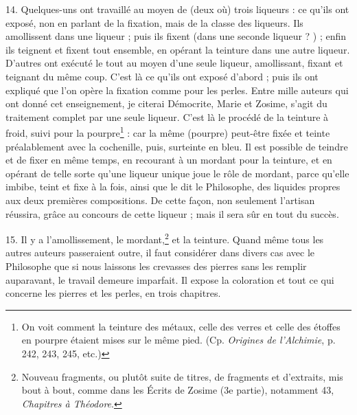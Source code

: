 \documentclass[a4paper, 11pt, oneside, polutonikogreek, french]{article}
\begin{document}
14. Quelques-uns ont travaillé au moyen de (deux où) trois liqueurs : ce qu'ils ont exposé, non en parlant de la fixation, mais de la classe des liqueurs. Ils amollissent dans une liqueur ; puis ils fixent (dans une seconde liqueur ? ) ; enfin ils teignent et fixent tout ensemble, en opérant la teinture dans une autre liqueur. D'autres ont exécuté le tout au moyen d'une seule liqueur, amollissant, fixant et teignant du même coup. C'est là ce qu'ils ont exposé d'abord ; puis ils ont expliqué que l'on opère la fixation comme pour les perles. Entre mille auteurs qui ont donné cet enseignement, je citerai Démocrite, Marie et Zosime, s'agit du traitement complet par une seule liqueur. C'est là le procédé de la teinture à froid, suivi pour la pourpre\footnote{On voit comment la teinture des métaux, celle des verres et celle des étoffes en pourpre étaient mises sur le même pied. (Cp. \emph{Origines de l'Alchimie}, p. 242, 243, 245, etc.)} : car la même (pourpre) peut-être fixée et teinte préalablement avec la cochenille, puis, surteinte en bleu. Il est possible de teindre et de fixer en même temps, en recourant à un mordant pour la teinture, et en opérant de telle sorte qu'une liqueur unique joue le rôle de mordant, parce qu'elle imbibe, teint et fixe à la fois, ainsi que le dit le Philosophe, des liquides propres aux deux premières compositions. De cette façon, non seulement l'artisan réussira, grâce au concours de cette liqueur ; mais il sera sûr en tout du succès.

15. Il y a l'amollissement, le mordant,\footnote{Nouveau fragments, ou plutôt suite de titres, de fragments et d'extraits, mis bout à bout, comme dans les Écrits de Zosime (3e partie), notamment 43, \emph{Chapitres à Théodore}.} et la teinture. Quand même tous les autres auteurs passeraient outre, il faut considérer dans divers cas avec le Philosophe que si nous laissons les crevasses des pierres sans les remplir auparavant, le travail demeure imparfait. Il expose la coloration et tout ce qui concerne les pierres et les perles, en trois chapitres.
\end{document}

